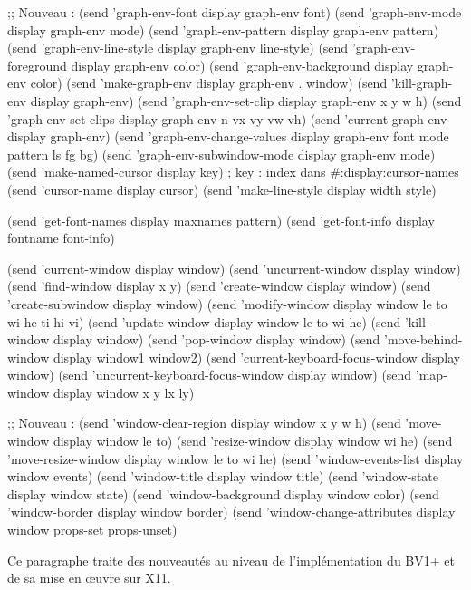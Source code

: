 ;; Nouveau :
\EndLL
\BeginHide
(send 'graph-env-font display graph-env font)
(send 'graph-env-mode display graph-env mode)
(send 'graph-env-pattern display graph-env pattern)
(send 'graph-env-line-style display graph-env line-style)
(send 'graph-env-foreground display graph-env color)
(send 'graph-env-background display graph-env color)
(send 'make-graph-env display graph-env . window)
(send 'kill-graph-env display graph-env)
(send 'graph-env-set-clip display graph-env x y w h)
(send 'graph-env-set-clips display graph-env n vx vy vw vh)
(send 'current-graph-env display graph-env)
(send 'graph-env-change-values display graph-env font mode pattern ls fg bg)
(send 'graph-env-subwindow-mode display graph-env mode)
\EndHide
\BeginLL
(send 'make-named-cursor display key) ; key : index dans #:display:cursor-names
(send 'cursor-name display cursor)
(send 'make-line-style display width style)

(send 'get-font-names display maxnames pattern)
(send 'get-font-info display fontname font-info)

\EndLL


\BeginLL

(send 'current-window display window)
(send 'uncurrent-window display window)
(send 'find-window display x y)
(send 'create-window display window)
(send 'create-subwindow display window)
(send 'modify-window display window le to wi he ti hi vi)
(send 'update-window display window le to wi he)
(send 'kill-window display window)
(send 'pop-window display window)
(send 'move-behind-window display window1 window2)
(send 'current-keyboard-focus-window display window)
(send 'uncurrent-keyboard-focus-window display window)
(send 'map-window display window x y lx ly)

;; Nouveau :
(send 'window-clear-region display window x y w h)      
(send 'move-window display window le to)        
(send 'resize-window display window wi he)
(send 'move-resize-window display window le to wi he)
(send 'window-events-list display window events)
(send 'window-title display window title)
(send 'window-state display window state)
(send 'window-background display window color)
(send 'window-border display window border)
(send 'window-change-attributes display window props-set props-unset)
\EndLL





Ce paragraphe traite des nouveaut\'{e}s au niveau de l'impl\'{e}mentation du BV1+ et
de sa mise en \oe uvre sur X11.

